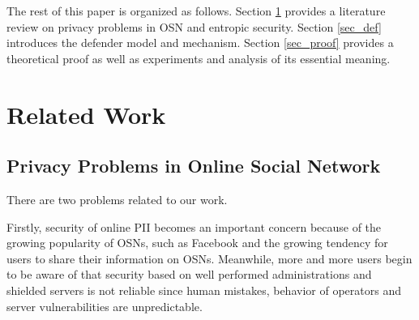 \documentclass[10pt, conference, compsocconf]{IEEEtran}
\begin{document}
	
	The rest of this paper is organized as follows.
	Section \ref{sec_rw} provides a literature review on privacy problems in OSN and 
	entropic security. Section \ref{sec_def} introduces the defender model and mechanism.
	Section \ref{sec_proof} provides a theoretical proof as well as experiments and analysis
	of its essential meaning.
	
	
	

\section{Related Work}	\label{sec_rw}
	\subsection{Privacy Problems in Online Social Network}
	There are two problems related to our work.	
	
	Firstly, security of online PII becomes an important concern \cite{lzf1, lzf2} because
	of the growing popularity of OSNs, such as Facebook and
	the growing tendency for users to share their information
	on OSNs.
	Meanwhile, more and more users
	begin to be aware of that security based on well performed 
	administrations and shielded
	servers is not reliable since human mistakes, behavior of operators and server 
	vulnerabilities are unpredictable. 
	
\end{document}
